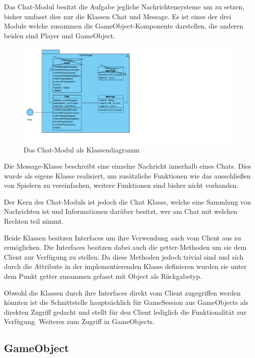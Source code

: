 \documentclass[fontsize=12pt,paper=a4,twoside]{scrartcl}
\begin{document}
Das Chat-Modul besitzt die Aufgabe jegliche Nachrichtensysteme um zu setzen, bisher umfasst dies nur die Klassen Chat und Message. Es ist eines der drei Module welche zusammen die GameObject-Komponente darstellen, die anderen beiden sind Player und GameObject.

\begin{figure}[h]
\centering
\includegraphics[width=1.0\linewidth]{ChatClass}
\caption{Das Chat-Modul als Klassendiagramm}
\label{fig:ChatClass}
\end{figure}

Die Message-Klasse beschreibt eine einzelne Nachricht innerhalb eines Chats. Dies wurde als eigene Klasse realisiert, um zusätzliche Funktionen wie das ausschließen von Spielern zu vereinfachen, weitere Funktionen sind bisher nicht vorhanden.

Der Kern des Chat-Moduls ist jedoch die Chat Klasse, welche eine Sammlung von Nachrichten ist und Informationen darüber besitzt, wer am Chat mit welchen Rechten teil nimmt.

Beide Klassen besitzen Interfaces um ihre Verwendung auch vom Client aus zu ermöglichen. Die Interfaces besitzen dabei auch die getter-Methoden um sie dem Client zur Verfügung zu stellen. Da diese Methoden jedoch trivial sind und sich durch die Attribute in der implementierenden Klasse definieren wurden sie unter dem Punkt getter zusammen gefasst mit Object als Rückgabetyp. 

Obwohl die Klassen durch ihre Interfaces direkt vom Client zugegriffen werden könnten ist die Schnittstelle hauptsächlich für GameSession aus GameObjects als direkten Zugriff gedacht und stellt für den Client lediglich die Funktionalität zur Verfügung. Weiteres zum Zugriff in GameObjects.

\subsection{GameObject}
\end{document}
